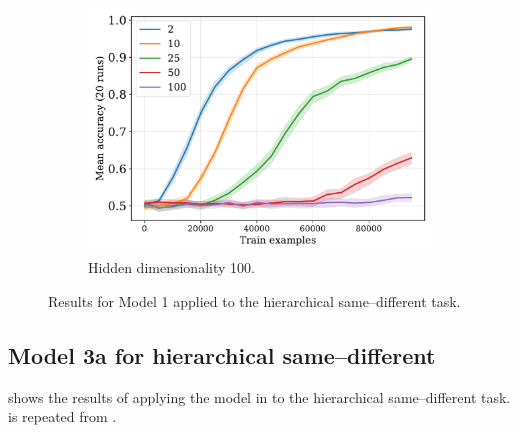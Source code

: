 \begin{figure}[H]
  \begin{subfigure}{0.45\linewidth}
    \includegraphics[width=1\textwidth]{../fig/flatpremack-h1-train_size-embed_dim-hidden_dim=100.pdf}
    \caption{Hidden dimensionality 100.}
  \end{subfigure}
  \caption{Results for Model 1 applied to the hierarchical same--different task.}
  \label{fig:model1:premack}
\end{figure}


\newpage


\subsection{Model 3a for hierarchical same--different}

 shows the results of applying the model in  to the hierarchical same--different task.  is repeated from .

